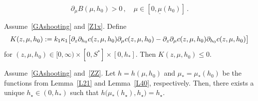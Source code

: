 \documentclass[10pt,a4paper]{amsart}
\begin{document}
\begin{equation}\label{Bq}
\partial_\mu B(\mu,h_0)>0\,,\quad \mu\in [0,\underline{\mu}(h_0)]\,.
\end{equation}  

\begin{lem}\label{L30}
Assume~\eqref{GAshooting} and \eqref{Z1x}.  Define
\begin{equation*}
K(z,\mu,h_0):=k_1\kappa_1\big[\partial_z\partial_{h_0}{\rm c}(z,\mu,h_0)\partial_\mu{\rm c}(z,\mu,h_0)-\partial_z\partial_\mu{\rm c}(z,\mu,h_0)\partial_{h_0}{\rm c}(z,\mu,h_0)\big]
\end{equation*}
for $(z,\mu,h_0)\in[0,\infty)\times[0,S^*]\times[0,h_*]$. Then $K(z,\mu,h_0)\le 0$.
\end{lem}

\begin{lem}\label{P30}
Assume~\eqref{GAshooting} and~\eqref{ZZ}. Let $h=h(\mu,h_0)$ and $\mu_*=\mu_*(h_0)$ be the functions from Lemma~\ref{L21} and Lemma~\ref{L40}, respectively. Then, there exists a unique $h_\star\in (0,h_*)$ such that $h\big(\mu_*(h_\star),h_\star)=h_\star$.
\end{lem}
\end{document}
